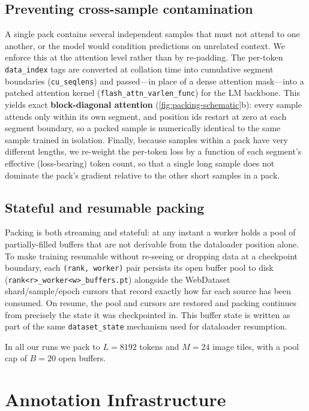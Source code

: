 \subsection{Preventing cross-sample contamination}

A single pack contains several independent samples that must not attend to one another, or the model would condition predictions on unrelated context.
We enforce this at the attention level rather than by re-padding.
The per-token \texttt{data\_index} tags are converted at collation time into cumulative segment boundaries (\texttt{cu\_seqlens}) and passed---in place of a dense attention mask---into a patched attention kernel (\texttt{flash\_attn\_varlen\_func}) for the LM backbone.
This yields exact \textbf{block-diagonal attention} (\cref{fig:packing-schematic}b): every sample attends only within its own segment, and position ids restart at zero at each segment boundary, so a packed sample is numerically identical to the same sample trained in isolation.
Finally, because samples within a pack have very different lengths, we re-weight the per-token loss by a function of each segment's effective (loss-bearing) token count, so that a single long sample does not dominate the pack's gradient relative to the other short samples in a pack.

\subsection{Stateful and resumable packing}

Packing is both streaming and stateful: at any instant a worker holds a pool of partially-filled buffers that are not derivable from the dataloader position alone.
To make training resumable without re-seeing or dropping data at a checkpoint boundary, each \texttt{(rank, worker)} pair persists its open buffer pool to disk (\texttt{rank<r>\_worker<w>\_buffers.pt}) alongside the WebDataset shard/sample/epoch cursors that record exactly how far each source has been consumed.
On resume, the pool and cursors are restored and packing continues from precisely the state it was checkpointed in.
This buffer state is written as part of the same \texttt{dataset\_state} mechanism used for dataloader resumption.

In all our runs we pack to $L = 8192$ tokens and $M = 24$ image tiles, with a pool cap of $B = 20$ open buffers.

\clearpage




\section{Annotation Infrastructure}\label{app:annotation}

